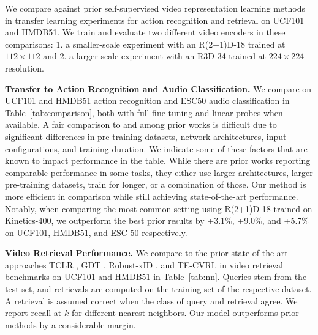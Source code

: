 \documentclass[letterpaper]{article}
\begin{document}
We compare against prior self-supervised video representation learning methods in transfer learning experiments for action recognition and retrieval on UCF101 and HMDB51.
We train and evaluate two different video encoders in these comparisons: 1. a smaller-scale experiment with an R(2+1)D-18 trained at $112\times112$ and 2. a larger-scale experiment with an R3D-34 trained at $224\times224$ resolution.


\noindent \textbf{Transfer to Action Recognition and Audio Classification.}
We compare on UCF101 and HMDB51 action recognition and ESC50 audio classification in Table~\ref{tab:comparison}, both with full fine-tuning and linear probes when available.
A fair comparison to and among prior works is difficult due to significant differences in pre-training datasets, network architectures, input configurations, and training duration.
We indicate some of these factors that are known to impact performance in the table.
While there are prior works \cite{recasens2021broaden,qian2020spatiotemporal} reporting comparable performance in some tasks, they either use larger architectures, larger pre-training datasets, train for longer, or a combination of those.
Our method is more efficient in comparison while still achieving state-of-the-art performance.
Notably, when comparing the most common setting using R(2+1)D-18 trained on Kinetics-400, we outperform the best prior results by +3.1\%, +9.0\%, and +5.7\% on UCF101, HMDB51, and ESC-50 respectively.

\noindent \textbf{Video Retrieval Performance.}
We compare to the prior state-of-the-art approaches TCLR \cite{dave2021tclr}, GDT \cite{patrick2020multi}, Robust-xID \cite{morgado2021robust}, and TE-CVRL \cite{jenni2021time} in video retrieval benchmarks on UCF101 and HMDB51 in Table~\ref{tab:nn}.
Queries stem from the test set, and retrievals are computed on the training set of the respective dataset.
A retrieval is assumed correct when the class of query and retrieval agree.
We report recall at $k$ for different nearest neighbors.
Our model outperforms prior methods by a considerable margin.
\end{document}
